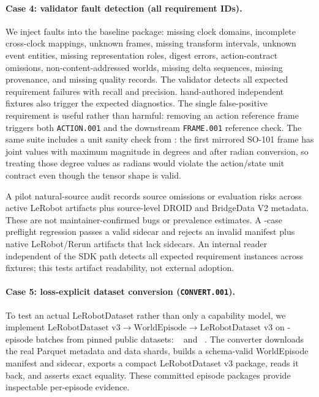 \paragraph{Case 4: validator fault detection (all requirement IDs).}
We inject \ExpFaultCaseCount{} faults into the baseline package: missing clock domains, incomplete cross-clock
mappings, unknown frames, missing transform intervals, unknown event entities, missing
representation roles, digest errors, action-contract omissions, non-content-addressed worlds,
missing delta sequences, missing provenance, and missing quality records. The validator detects all
\ExpFaultTruePositiveCount{} expected requirement failures with \ExpFaultRecall{} recall and
\ExpFaultPrecision{} precision. \ExpIndependentFixtureCount{} hand-authored
independent fixtures also trigger the expected diagnostics. The single false-positive requirement is
useful rather than harmful: removing an action reference frame triggers both \texttt{ACTION.001} and
the downstream \texttt{FRAME.001} reference check. The same suite includes a unit sanity check from
: the first mirrored SO-101 frame has
\ExpJointSampleCount{} joint values with maximum magnitude \ExpJointSampleMaxDegrees{} in degrees
and \ExpJointSampleMaxRadians{} after radian conversion, so treating those degree values as radians
would violate the action/state unit contract even though the tensor shape is valid.

A pilot natural-source audit records \ExpNaturalFindingCount{} source omissions or evaluation risks
across \ExpNaturalActiveDatasetCount{} active
LeRobot artifacts plus source-level DROID and BridgeData V2 metadata. These are not
maintainer-confirmed bugs or prevalence estimates. A \ExpPreflightCaseCount-case preflight regression
passes a valid sidecar and rejects an invalid manifest plus native LeRobot/Rerun artifacts that lack
sidecars. An internal reader independent of the SDK path detects all
\ExpCleanroomRequirementCount{} expected requirement instances across
\ExpCleanroomFixtureCount{} fixtures; this tests artifact readability, not external adoption.

\paragraph{Case 5: loss-explicit dataset conversion (\texttt{CONVERT.001}).}
To test an actual LeRobotDataset rather than only a capability model, we implement
\(\text{LeRobotDataset v3} \rightarrow \text{WorldEpisode} \rightarrow \text{LeRobotDataset v3}\)
on \ExpRoundtripBatchEpisodes-episode batches from \ExpRoundtripDatasetCount{} pinned public datasets:
~\citep{lerobot_svla_so101_pickplace} and
~\citep{lerobot_pusht}. The converter downloads the real Parquet metadata and
data shards, builds a schema-valid WorldEpisode manifest and sidecar, exports a compact
LeRobotDataset v3 package, reads it back, and asserts exact equality. These
\ExpRoundtripEpisodeCount{} committed episode packages provide inspectable per-episode evidence.

